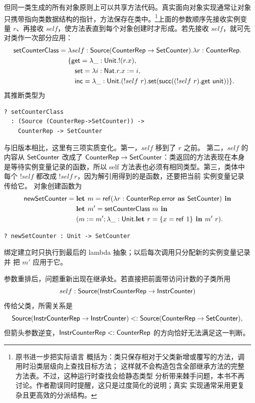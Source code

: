 但同一类生成的所有对象原则上可以共享方法代码。真实面向对象实现通常让对象
只携带指向类数据结构的指针，方法保存在类中。\footnote{原书进一步把实际语言
概括为：类只保存相对于父类新增或覆写的方法，调用时沿类层级向上查找目标方法；
这样就不会构造包含全部继承方法的完整方法表。不过，这种运行时查找会给静态类型
分析带来棘手问题，本书不再讨论。作者勘误同时提醒，这只是过度简化的说明；真实
实现通常采用更复杂且更高效的分派结构。}上面的参数顺序先接收实例变量
\(r\)、再接收 \(self\)，使方法表直到每个对象创建时才形成。若先接收
\(self\)，就可先对类作一次部分应用：
\[
\begin{aligned}
\mathsf{setCounterClass}
={}&\lambda self:\mathsf{Source}
(\mathsf{CounterRep}\to\mathsf{SetCounter}).
\lambda r:\mathsf{CounterRep}.\\
&\{\mathsf{get}=\lambda\_:\mathsf{Unit}.!(r.x),\\
&\quad\mathsf{set}=\lambda i:\mathsf{Nat}.r.x:=i,\\
&\quad\mathsf{inc}=\lambda\_:\mathsf{Unit}.
(!self\ r).\mathsf{set}
(\mathsf{succ}((!self\ r).\mathsf{get}\ \mathsf{unit}))\}.
\end{aligned}
\]
其推断类型为
\begin{lstlisting}
? setCounterClass
  : (Source (CounterRep->SetCounter)) ->
    CounterRep -> SetCounter
\end{lstlisting}
与旧版本相比，这里有三项实质变化。第一，\(self\) 移到了 \(r\) 之前。
第二，\(self\) 的内容从 \(\mathsf{SetCounter}\) 改成了
\(\mathsf{CounterRep}\to\mathsf{SetCounter}\)：类返回的方法表现在本身
是等待实例变量记录的函数，所以 self 方法表也必须有相同类型。第三，类体中
每个 \(!self\) 都改成 \(!self\ r\)，因为解引用得到的是函数，还要把当前
实例变量记录传给它。
对象创建函数为
\[
\begin{aligned}
\mathsf{newSetCounter}={}&
\textbf{let }m=\mathsf{ref}
(\lambda r:\mathsf{CounterRep}.
\mathsf{error}\textbf{ as }\mathsf{SetCounter})\textbf{ in}\\
&\textbf{let }m'=\mathsf{setCounterClass}\ m\textbf{ in}\\
&(m:=m';\lambda\_:\mathsf{Unit}.
  \textbf{let }r=\{x=\mathsf{ref}\ 1\}\textbf{ in }m'\ r).
\end{aligned}
\]
\begin{lstlisting}
? newSetCounter : Unit -> SetCounter
\end{lstlisting}
绑定建立时只执行到最后的 lambda 抽象；以后每次调用只分配新的实例变量记录并
把 \(m'\) 应用于它。

参数重排后，问题重新出现在继承处。若直接把前面带访问计数的子类所用
\[
self:\mathsf{Source}
(\mathsf{InstrCounterRep}\to\mathsf{InstrCounter})
\]
传给父类，所需关系是
\[
\mathsf{Source}
(\mathsf{InstrCounterRep}\to\mathsf{InstrCounter})
<:
\mathsf{Source}
(\mathsf{CounterRep}\to\mathsf{SetCounter}),
\]
但箭头参数逆变，\(\mathsf{InstrCounterRep}<:\mathsf{CounterRep}\)
的方向恰好无法满足这一判断。

